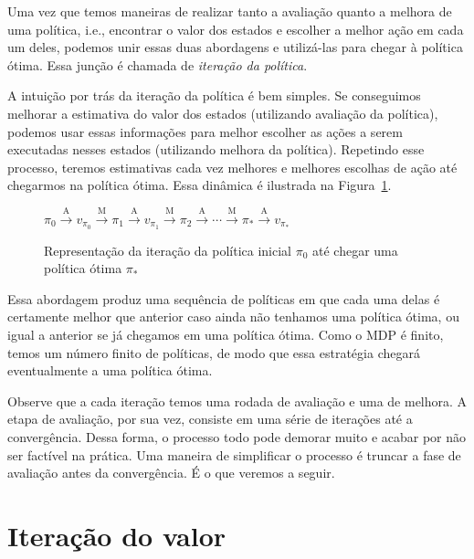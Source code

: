 \documentclass{article}
\begin{document}
        Uma vez que temos maneiras de realizar tanto a avaliação quanto a melhora de uma política, i.e., encontrar o valor dos estados e escolher a melhor ação em cada um deles, podemos unir essas duas abordagens e utilizá-las para chegar à política ótima. Essa junção é chamada de \emph{iteração da política}.
        
        A intuição por trás da iteração da política é bem simples. Se conseguimos melhorar a estimativa do valor dos estados (utilizando avaliação da política), podemos usar essas informações para melhor escolher as ações a serem executadas nesses estados (utilizando melhora da política). Repetindo esse processo, teremos estimativas cada vez melhores e melhores escolhas de ação até chegarmos na política ótima. Essa dinâmica é ilustrada na Figura~\ref{fig:policy-iteration}.
        
        \begin{figure}[ht]
            \centering
            \begin{math}
                \pi_0 \xrightarrow{\ \textrm{A} \ } 
                v_{\pi_0} \xrightarrow{\ \textrm{M} \ } 
                \pi_1 \xrightarrow{\ \textrm{A} \ } 
                v_{\pi_1} \xrightarrow{\ \textrm{M} \ } 
                \pi_2 \xrightarrow{\ \textrm{A} \ } 
                \cdots \xrightarrow{\ \textrm{M} \ }
                \pi_* \xrightarrow{\ \textrm{A} \ } v_{\pi_*}
            \end{math}
            \caption{Representação da iteração da política inicial $\pi_0$ até chegar uma política ótima $\pi_*$}
            \label{fig:policy-iteration}
        \end{figure}
        
        Essa abordagem produz uma sequência de políticas em que cada uma delas é certamente melhor que anterior caso ainda não tenhamos uma política ótima, ou igual a anterior se já chegamos em uma política ótima. Como o MDP é finito, temos um número finito de políticas, de modo que essa estratégia chegará eventualmente a uma política ótima.
        
        Observe que a cada iteração temos uma rodada de avaliação e uma de melhora. A etapa de avaliação, por sua vez, consiste em uma série de iterações até a convergência. Dessa forma, o processo todo pode demorar muito e acabar por não ser factível na prática. Uma maneira de simplificar o processo é truncar a fase de avaliação antes da convergência. É o que veremos a seguir.

    \section{Iteração do valor}
\end{document}
